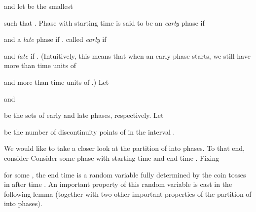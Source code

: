 \documentclass[11pt]{article}
\def\LongVersion{}
\def\LongVersionEnd{}
\def\ShortVersion{}
\def\ShortVersionEnd{}
\theoremstyle{definition}
\theoremstyle{plain}
\theoremstyle{definition}
\theoremstyle{plain}
\theoremstyle{definition}
\theoremstyle{plain}
\newcommand{\NotationLabel}[1]{\label{notationTable:#1}\ignorespaces}
\begin{document}
and let  be the smallest

such that
.
\NotationLabel{analysis:late-time}
Phase  with starting time  is
\LongVersion said to be an \emph{early}
phase if

and a \emph{late} phase if
.
\LongVersionEnd \ShortVersion called \emph{early} if

and \emph{late} if
.
\ShortVersionEnd (Intuitively, this means that when an early phase starts, we still have more
than  time units of

and more than  time units of
.)
Let

\NotationLabel{analysis:P-early}
and

\NotationLabel{analysis:P-late}
be the sets of early and late phases, respectively.
Let

\NotationLabel{analysis:K}
be the number of discontinuity points of  in the interval
.

We would like to take a closer look at the partition of  into
phases.
\LongVersion To that end, consider
\LongVersionEnd \ShortVersion Consider
\ShortVersionEnd some phase  with starting time  and end
time .
Fixing

for some
,
the end time  is a random variable fully determined by the coin tosses
in  after time .
\LongVersion An important property of this random variable is cast in the following lemma
(together with
two other important properties of the partition of  into
phases).
\LongVersionEnd 
\end{document}
